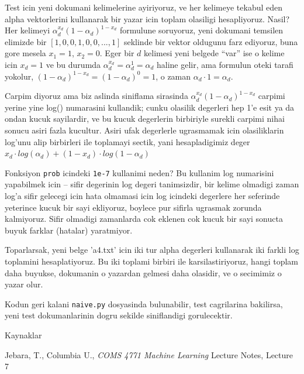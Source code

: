 \documentclass[12pt,fleqn]{article}
\begin{document}
Test icin yeni dokumani kelimelerine ayiriyoruz, ve her kelimeye tekabul eden
alpha vektorlerini kullanarak bir yazar icin toplam olasiligi
hesapliyoruz. Nasil? Her kelimeyi $\alpha_d^{x_d}(1-\alpha_d)^{1-x_d}$ formulune
soruyoruz, yeni dokumani temsilen elimizde bir $[1,0,0,1,0,0,...,1]$ seklinde
bir vektor oldugunu farz ediyoruz, buna gore mesela $x_1=1$, $x_2=0$. Eger bir
$d$ kelimesi yeni belgede ``var'' ise o kelime icin $x_d = 1$ ve bu durumda
$\alpha_d^{x_d} = \alpha_d^{1} = \alpha_d$ haline gelir, ama formulun oteki
tarafi yokolur, $(1-\alpha_d)^{1-x_d} = (1-\alpha_d)^0 = 1$, o zaman $\alpha_d
\cdot 1 = \alpha_d$.

Carpim diyoruz ama biz aslinda siniflama sirasinda
$\alpha_d^{x_d}(1-\alpha_d)^{1-x_d}$ carpimi yerine yine log() numarasini
kullandik; cunku olasilik degerleri hep 1'e esit ya da ondan kucuk sayilardir,
ve bu kucuk degerlerin birbiriyle surekli carpimi nihai sonucu asiri fazla
kucultur. Asiri ufak degerlerle ugrasmamak icin olasiliklarin log'unu alip
birbirleri ile toplamayi sectik, yani hesapladigimiz deger $x_d \cdot
log(\alpha_d) + (1-x_d) \cdot log(1-\alpha_d)$

Fonksiyon \verb!prob! icindeki \verb!1e-7! kullanimi neden? Bu kullanim log
numarisini yapabilmek icin -- sifir degerinin log degeri tanimsizdir, bir
kelime olmadigi zaman log'a sifir gelecegi icin hata olmamasi icin log icindeki 
degerlere her seferinde yeterince kucuk bir sayi ekliyoruz, boylece pur sifirla 
ugrasmak zorunda kalmiyoruz. Sifir olmadigi zamanlarda cok eklenen cok kucuk bir
sayi sonucta buyuk farklar (hatalar) yaratmiyor.

Toparlarsak, yeni belge 'a4.txt' icin iki tur alpha degerleri kullanarak iki
farkli log toplamini hesaplatiyoruz. Bu iki toplami birbiri ile karsilastiriyoruz,
hangi toplam daha buyukse, dokumanin o yazardan gelmesi daha olasidir, ve o
secimimiz o yazar olur.

Kodun geri kalani \verb!naive.py! dosyasinda bulunabilir, test cagrilarina
bakilirsa, yeni test dokumanlarinin dogru sekilde siniflandigi gorulecektir.



Kaynaklar

Jebara, T., Columbia U., {\em COMS 4771 Machine Learning} Lecture Notes, Lecture
7
\end{document}
